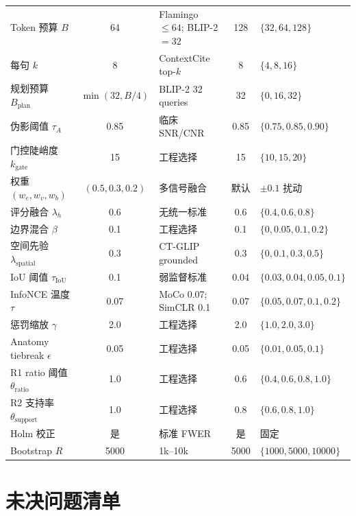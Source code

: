\documentclass[11pt,a4paper]{article}
\theoremstyle{definition}
\begin{document}
\begin{longtable}{p{3.6cm}cp{3cm}cp{3.6cm}}
Token 预算 $B$ & 64 & Flamingo $\leq 64$; BLIP-2 $=32$ & 128 & $\{32,64,128\}$ \\
每句 $k$ & 8 & ContextCite top-$k$ & 8 & $\{4,8,16\}$ \\
规划预算 $B_{\mathrm{plan}}$ & $\min(32,B/4)$ & BLIP-2 32 queries & 32 & $\{0,16,32\}$ \\
伪影阈值 $\tau_A$ & 0.85 & 临床 SNR/CNR & 0.85 & $\{0.75,0.85,0.90\}$ \\
门控陡峭度 $k_{\mathrm{gate}}$ & 15 & 工程选择 & 15 & $\{10,15,20\}$ \\
权重 $(w_e,w_v,w_b)$ & $(0.5,0.3,0.2)$ & 多信号融合 & 默认 & $\pm 0.1$ 扰动 \\
评分融合 $\lambda_h$ & 0.6 & 无统一标准 & 0.6 & $\{0.4,0.6,0.8\}$ \\
边界混合 $\beta$ & 0.1 & 工程选择 & 0.1 & $\{0,0.05,0.1,0.2\}$ \\
空间先验 $\lambda_{\mathrm{spatial}}$ & 0.3 & CT-GLIP grounded & 0.3 & $\{0,0.1,0.3,0.5\}$ \\
IoU 阈值 $\tau_{\mathrm{IoU}}$ & 0.1 & 弱监督标准 & 0.04 & $\{0.03,0.04,0.05,0.1\}$ \\
InfoNCE 温度 $\tau$ & 0.07 & MoCo 0.07; SimCLR 0.1 & 0.07 & $\{0.05,0.07,0.1,0.2\}$ \\
惩罚缩放 $\gamma$ & 2.0 & 工程选择 & 2.0 & $\{1.0,2.0,3.0\}$ \\
Anatomy tiebreak $\epsilon$ & 0.05 & 工程选择 & 0.05 & $\{0.01,0.05,0.1\}$ \\
R1 ratio 阈值 $\theta_{\mathrm{ratio}}$ & 1.0 & 工程选择 & 0.6 & $\{0.4,0.6,0.8,1.0\}$ \\
R2 支持率 $\theta_{\mathrm{support}}$ & 1.0 & 工程选择 & 0.8 & $\{0.6,0.8,1.0\}$ \\
Holm 校正 & 是 & 标准 FWER & 是 & 固定 \\
Bootstrap $R$ & 5000 & 1k--10k & 5000 & $\{1000,5000,10000\}$ \\
\bottomrule
\end{longtable}


\section{未决问题清单}
\end{document}
